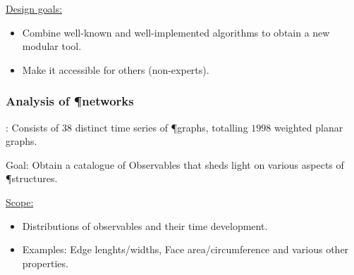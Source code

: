 \documentclass[	hyperref={pdfpagelabels=false}, xcolor=dvipsnames,
		11pt]{beamer}
\begin{document}
\begin{frame}
\begin{columns}
\begin{column}{6cm}
\begin{overprint}
	\end{overprint}
	\end{column}
	\end{columns}

		\begin{alertblock}{\underline{Design goals:}}
		\begin{itemize}
		  	\item Combine well-known and well-implemented algorithms to obtain a new modular tool.
		  	\item Make it accessible for others (\eg non-experts).
		\end{itemize}
		\end{alertblock}
\end{frame}

\begin{frame}
    \frametitle{Analysis of \P networks} 

	\begin{block}{\data:} 
		Consists of $38$ distinct time series of \P graphs, totalling $1998$ weighted planar graphs.
	\end{block}

	\begin{block}{Goal:} 
		Obtain a catalogue of Observables that sheds light on various aspects of \P structures.
	\end{block}

	\begin{alertblock}{\underline{Scope:}}
	 \begin{itemize}
	  \item Distributions of observables and their time development.
	  \item Examples: Edge lenghts/widths, Face area/circumference and various other properties.
	 \end{itemize}
	\end{alertblock}
\end{frame}
\end{document}
